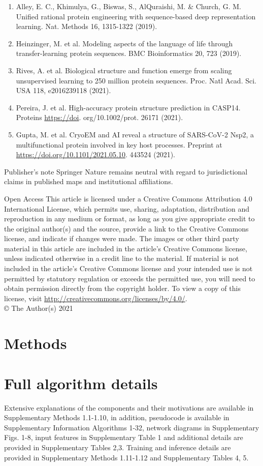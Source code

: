 \documentclass[10pt]{article}
\begin{document}
\begin{enumerate}
  \item Alley, E. C., Khimulya, G., Biswas, S., AlQuraishi, M. \& Church, G. M. Unified rational protein engineering with sequence-based deep representation learning. Nat. Methods 16, 1315-1322 (2019).
  \item Heinzinger, M. et al. Modeling aspects of the language of life through transfer-learning protein sequences. BMC Bioinformatics 20, 723 (2019).
  \item Rives, A. et al. Biological structure and function emerge from scaling unsupervised learning to 250 million protein sequences. Proc. Natl Acad. Sci. USA 118, e2016239118 (2021).
  \item Pereira, J. et al. High-accuracy protein structure prediction in CASP14. Proteins \href{https://doi}{https://doi}. org/10.1002/prot. 26171 (2021).
  \item Gupta, M. et al. CryoEM and AI reveal a structure of SARS-CoV-2 Nsp2, a multifunctional protein involved in key host processes. Preprint at \href{https://doi.org/10.1101/2021.05.10}{https://doi.org/10.1101/2021.05.10}. 443524 (2021).
\end{enumerate}

Publisher's note Springer Nature remains neutral with regard to jurisdictional claims in published maps and institutional affiliations.

Open Access This article is licensed under a Creative Commons Attribution 4.0 International License, which permits use, sharing, adaptation, distribution and reproduction in any medium or format, as long as you give appropriate credit to the original author(s) and the source, provide a link to the Creative Commons license, and indicate if changes were made. The images or other third party material in this article are included in the article's Creative Commons license, unless indicated otherwise in a credit line to the material. If material is not included in the article's Creative Commons license and your intended use is not permitted by statutory regulation or exceeds the permitted use, you will need to obtain permission directly from the copyright holder. To view a copy of this license, visit \href{http://creativecommons.org/licenses/by/4.0/}{http://creativecommons.org/licenses/by/4.0/}.\\
© The Author(s) 2021

\section*{Methods}
\section*{Full algorithm details}
Extensive explanations of the components and their motivations are available in Supplementary Methods 1.1-1.10, in addition, pseudocode is available in Supplementary Information Algorithms 1-32, network diagrams in Supplementary Figs. 1-8, input features in Supplementary Table 1 and additional details are provided in Supplementary Tables 2,3. Training and inference details are provided in Supplementary Methods 1.11-1.12 and Supplementary Tables 4, 5.
\end{document}
